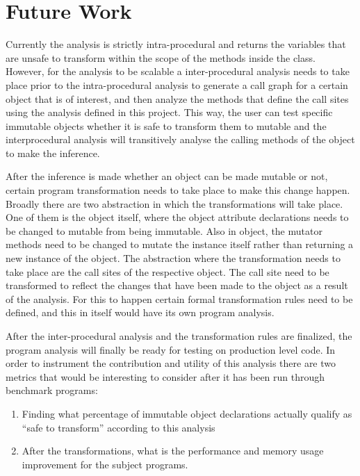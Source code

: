 \section{Future Work}
Currently the analysis is strictly intra-procedural and returns the variables that are unsafe to transform within the scope of the methods inside the class. However, for the analysis to be scalable a inter-procedural analysis needs to take place prior to the intra-procedural analysis to generate a call graph for a certain object that is of interest, and then analyze the methods that define the call sites using the analysis defined in this project. This way, the user can test specific immutable objects whether it is safe to transform them to mutable and the interprocedural analysis will transitively analyse the calling methods of the object to make the inference.

After the inference is made whether an object can be made mutable or not, certain program transformation needs to take place to make this change happen. Broadly there are two abstraction in which the transformations will take place. One of them is the object itself, where the object attribute declarations needs to be changed to mutable from being immutable. Also in object, the mutator methods need to be changed to mutate the instance itself rather than returning a new instance of the object. The abstraction where the transformation needs to take place are the call sites of the respective object. The call site need to be transformed to reflect the changes that have been made to the object as a result of the analysis. For this to happen certain formal transformation rules need to be defined, and this in itself would have its own program analysis.

After the inter-procedural analysis and the transformation rules are finalized, the program analysis will finally be ready for testing on production level code. In order to instrument the contribution and utility of this analysis there are two metrics that would be interesting to consider after it has been run through benchmark programs:
\begin{enumerate}
\item Finding what percentage of immutable object declarations actually qualify as ``safe to transform'' according to this analysis
\item After the transformations, what is the performance and memory usage improvement for the subject programs.
\end{enumerate}